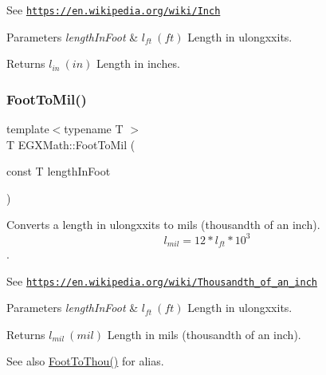 See \href{https://en.wikipedia.org/wiki/Inch}{\tt https\+://en.\+wikipedia.\+org/wiki/\+Inch} 
\begin{DoxyParams}{Parameters}
{\em length\+In\+Foot} & $ l_{ft}\ (ft)$ Length in ulongxxits. \\
\hline
\end{DoxyParams}
\begin{DoxyReturn}{Returns}
$ l_{in}\ (in)$ Length in inches. 
\end{DoxyReturn}
\mbox{\label{group___e_g_x_math-_conversions-_length_conversions-_imperial-_foot-_imperial_gab25e7780b3c0429c1a05eafbcbe322a5}} 
\subsubsection{\texorpdfstring{Foot\+To\+Mil()}{FootToMil()}}
{\footnotesize\ttfamily template$<$typename T $>$ \\
T E\+G\+X\+Math\+::\+Foot\+To\+Mil (\begin{DoxyParamCaption}\item[{const T}]{length\+In\+Foot }\end{DoxyParamCaption})}



Converts a length in ulongxxits to mils (thousandth of an inch). \[ l_{mil}=12 * l_{ft} * 10^{3} \]. 

See \href{https://en.wikipedia.org/wiki/Thousandth_of_an_inch}{\tt https\+://en.\+wikipedia.\+org/wiki/\+Thousandth\+\_\+of\+\_\+an\+\_\+inch} 
\begin{DoxyParams}{Parameters}
{\em length\+In\+Foot} & $ l_{ft}\ (ft)$ Length in ulongxxits. \\
\hline
\end{DoxyParams}
\begin{DoxyReturn}{Returns}
$ l_{mil}\ (mil)$ Length in mils (thousandth of an inch). 
\end{DoxyReturn}
\begin{DoxySeeAlso}{See also}
\mbox{\hyperlink{group___e_g_x_math-_conversions-_length_conversions-_imperial-_foot-_imperial_gab8b02110f4657f92b7de8a42b9494017}{Foot\+To\+Thou()}} for alias. 
\end{DoxySeeAlso}
\mbox{\label{group___e_g_x_math-_conversions-_length_conversions-_imperial-_foot-_imperial_gae582c3dbb801f710a44fe2eec4af1309}} 
